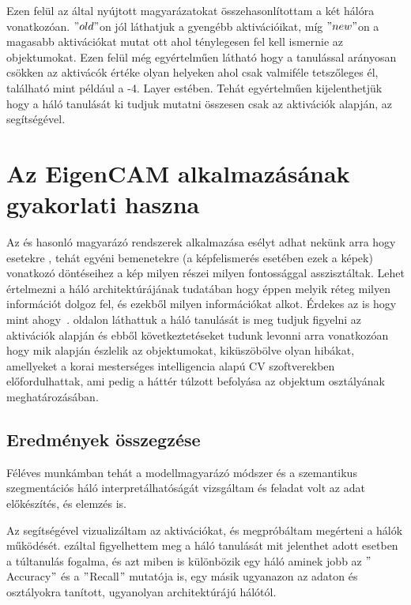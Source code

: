 \documentclass[12pt,oneside,a4paper]{article}
\newcommand{\newsection}[1]{\clearpage\section{#1}}\label{makro}
\theoremstyle{remark}
\newcommand{\oldh}{\( "old" \)}\label{makro2}
\newcommand{\newh}{\( "new" \)}
\begin{document}
Ezen felül az  által nyújtott magyarázatokat összehasonlítottam a két hálóra vonatkozóan.
\oldh on jól láthatjuk a gyengébb aktivációikat, míg \newh on a magasabb aktivációkat mutat ott ahol ténylegesen fel kell
ismernie az objektumokat.
Ezen felül még egyértelműen látható hogy a tanulással arányosan csökken az aktivácók értéke olyan helyeken ahol csak valmiféle
tetszőleges él, található mint például a -4. Layer estében.
Tehát egyértelműen kijelenthetjük hogy a háló tanulását ki tudjuk mutatni összesen csak az aktivációk alapján, az
 segítségével.

\newsection{Az EigenCAM alkalmazásának gyakorlati haszna}\label{sec:az-eigencam-alkalmazasanak-gyakorlati-haszna}
    Az és hasonló magyarázó rendszerek alkalmazása esélyt adhat nekünk arra hogy esetekre
    , tehát egyéni bemenetekre (a képfelismerés esetében ezek a képek) vonatkozó döntéseihez a kép milyen részei
    milyen fontossággal asszisztáltak.
    Lehet értelmezni a háló architektúrájának tudatában hogy éppen melyik réteg milyen információt dolgoz fel,
    és ezekből milyen információkat alkot.
    Érdekes az is hogy mint ahogy~\pageref{subsec:magyarazat}. oldalon láthattuk a háló tanulását is meg tudjuk
    figyelni az aktivációk alapján és ebből következtetéseket tudunk levonni arra vonatkozóan hogy mik alapján észlelik
    az objektumokat, kiküszöbölve olyan hibákat, amellyeket a korai mesterséges intelligencia  alapú \ac{CV} szoftverekben előfordulhattak, ami pedig a háttér
    túlzott befolyása az objektum osztályának meghatározásában.

\subsection{Eredmények összegzése}\label{subsec:osszegzes-es-kovetkeztetes}
    Féléves munkámban tehát a  modellmagyarázó módszer és a  szemantikus szegmentációs háló
    interpretálhatóságát vizsgáltam és feladat volt az adat előkészítés, és elemzés is.

    Az  segítségével vizualizáltam az aktivációkat, és megpróbáltam megérteni a hálók működését.
    ezáltal figyelhettem meg a háló tanulását mit jelenthet adott esetben a túltanulás fogalma, és azt miben is
    különbözik egy háló aminek jobb az \("\)Accuracy\("\) és a \("\)Recall\("\) mutatója is, egy másik ugyanazon az adaton és
    osztályokra tanított, ugyanolyan architektúrájú hálótól.
\end{document}
